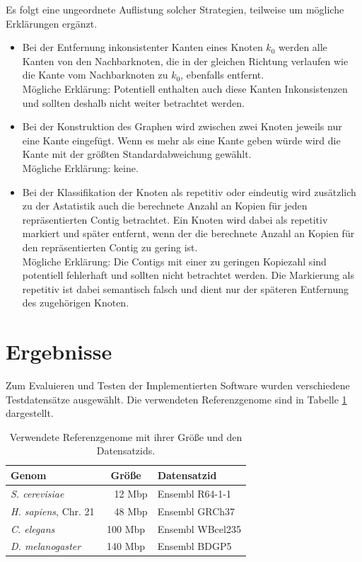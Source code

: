 \documentclass[a4paper,10pt,parskip]{scrartcl}
\begin{document}
Es folgt eine ungeordnete Auflistung solcher Strategien, teilweise um
mögliche Erklärungen ergänzt.
\begin{itemize}
\item Bei der Entfernung inkonsistenter Kanten eines Knoten $k_0$
  werden alle Kanten von den Nachbarknoten, die in der gleichen
  Richtung verlaufen wie die Kante vom Nachbarknoten zu $k_0$,
  ebenfalls entfernt. \\
  Mögliche Erklärung: Potentiell enthalten auch
  diese Kanten Inkonsistenzen und sollten deshalb nicht weiter
  betrachtet werden.
\item Bei der Konstruktion des Graphen wird zwischen zwei Knoten
  jeweils nur eine Kante eingefügt. Wenn es mehr als eine Kante geben
  würde wird die Kante mit der größten Standardabweichung
  gewählt. \\
  Mögliche Erklärung: keine.
\item Bei der Klassifikation der Knoten als repetitiv oder eindeutig
  wird zusätzlich zu der Astatistik auch die berechnete Anzahl an
  Kopien für jeden repräsentierten Contig betrachtet. Ein Knoten wird
  dabei als repetitiv markiert und später entfernt, wenn der die
  berechnete Anzahl an Kopien für den repräsentierten Contig zu gering
  ist. \\
  Mögliche Erklärung: Die Contigs mit einer zu geringen
  Kopiezahl sind potentiell fehlerhaft und sollten nicht betrachtet
  werden. Die Markierung als repetitiv ist dabei semantisch falsch und
  dient nur der späteren Entfernung des zugehörigen Knoten.
\end{itemize}

\section{Ergebnisse}

Zum Evaluieren und Testen der Implementierten Software wurden
verschiedene Testdatensätze ausgewählt. Die verwendeten Referenzgenome
sind in Tabelle \ref{tab: Referenzgenome} dargestellt.

\begin{table}
  \centering
  \begin{tabular}{l | c | l}
    Genom & Größe & Datensatzid \\
    \hline
    \textit{S. cerevisiae} & ~~12 Mbp & Ensembl R64-1-1 \\
    \textit{H. sapiens}, Chr. 21 & ~~48 Mbp & Ensembl GRCh37 \\
    \textit{C. elegans} & 100 Mbp & Ensembl WBcel235 \\
    \textit{D. melanogaster} & 140 Mbp & Ensembl BDGP5
  \end{tabular}
  \caption{\label{tab: Referenzgenome} Verwendete Referenzgenome mit
    ihrer Größe und den Datensatzids.}
\end{table}
\end{document}
